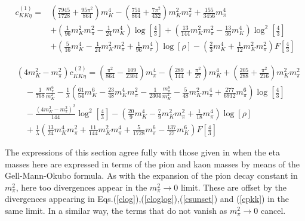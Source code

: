 \documentclass[12pt,a4paper]{article}
\begin{document}
\begin{align}
	{c}_{K K \eta}^{(1)} =& \left(\frac{7945}{1728} + \frac{95 \pi^2}{864}\right) m_{K}^4 - \left(\frac{751}{864} + \frac{7 \pi^2}{432} \right) m_{K}^2 m_{\pi}^2 + \frac{155}{3456} m_{\pi}^4 \nonumber \\
	& + \left(\frac{1}{96} m_{K}^2 m_{\pi}^2 - \frac{1}{24} m_{K}^4 \right) \log \left[ \frac{4}{3} \right] + \left(\frac{13}{144} m_{K}^2 m_{\pi}^2 - \frac{13}{36} m_{K}^4 \right) \log ^2 \left[ \frac{4}{3} \right] \nonumber \\
	& + \left(\frac{5}{16} m_{K}^4 -\frac{1}{24} m_{K}^2 m_{\pi}^2 + \frac{1}{96} m_{\pi}^4 \right) \log [\rho] - \left(\frac{2}{3} m_{K}^4 + \frac{1}{12} m_{K}^2 m_{\pi}^2 \right) F \left[ \frac{4}{3} \right] 
\end{align}

\begin{align}
	& ( 4 m_K^2 - m_{\pi}^2 ) {c}_{K K \eta}^{(2)} = \left(\frac{\pi ^2}{864}-\frac{109}{2304}\right) m_{\pi}^4 -\left(\frac{289}{144}+\frac{\pi ^2}{27}\right) m_{K}^4 +\left(\frac{205}{288}+\frac{\pi ^2}{216}\right) m_{K}^2 m_{\pi}^2 \nonumber \\
	& \quad  - \frac{1}{768} \frac{m_{\pi}^6}{m_{K}^2} - \frac{1}{\lambda} \left(\frac{61}{54} m_{K}^6 - \frac{23}{48} m_{K}^4 m_{\pi}^2 - \frac{1}{2304} \frac{m_{\pi}^8}{m_{K}^2} - \frac{5}{48} m_{K}^2 m_{\pi}^4 + \frac{277}{6912} m_{\pi}^6 \right) \log \left[ \frac{4}{3} \right] \nonumber \\
	& \quad - \frac{\left(4 m_{K}^2-m_{\pi}^2\right)^2}{144} \log^2 \left[\frac{4}{3}\right] -\left(\frac{20}{9} m_{K}^4 - \frac{7}{9} m_{K}^2 m_{\pi}^2 + \frac{1}{18} m_{\pi}^4 \right) \log [\rho] \nonumber \\
	& \quad + \frac{1}{\lambda} \left( \frac{13}{24} m_{K}^4 m_{\pi}^2 + \frac{11}{144} m_{K}^2 m_{\pi}^4 + \frac{5}{1728} m_{\pi}^6  -\frac{137}{27} m_{K}^6 \right) F \left[\frac{4}{3}\right]
\end{align}

The expressions of this section agree fully with those given in \cite{Kaiser:2007kf} when the eta masses here are expressed in terms of the pion and kaon masses by means of the Gell-Mann-Okubo formula. As with the expansion of the pion decay constant in $m_{\pi}^2$, here too divergences appear in the $m_{\pi}^2 \rightarrow 0$ limit. These are offset by the divergences appearing in Eqs.(\ref{clog}),(\ref{cloglog}),(\ref{csunset}) and (\ref{cpkk}) in the same limit.
In a similar way, the terms that do not vanish as $m_\pi^2\to 0$ cancel.
\end{document}
